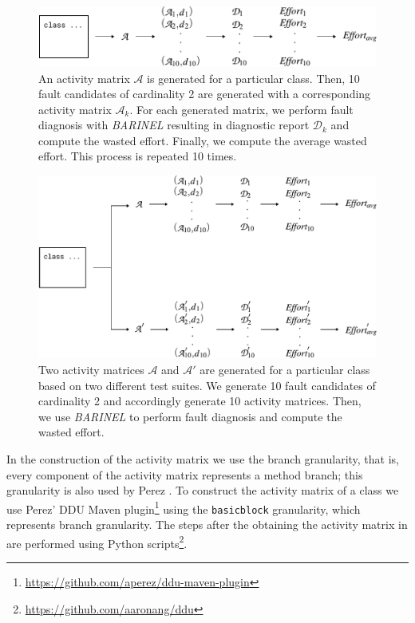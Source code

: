 \documentclass[twoside,a4paper,11pt]{memoir}
\begin{document}
\begin{figure}
  \includegraphics[width=\linewidth]{figures/fault_generation}
  \caption{An activity matrix $\mathcal{A}$ is generated for a particular class. Then, 10 fault candidates of cardinality 2 are generated with a corresponding activity matrix $\mathcal{A}_k$. For each generated matrix, we perform fault diagnosis with \emph{BARINEL} resulting in diagnostic report $\mathcal{D}_k$ and compute the wasted effort. Finally, we compute the average wasted effort. This process is repeated 10 times.}
  \label{fig:fault_generation}
\end{figure}

\begin{figure}
  \includegraphics[width=\linewidth]{figures/fault_generation_delta}
  \caption{Two activity matrices $\mathcal{A}$ and $\mathcal{A}'$ are generated for a particular class based on two different test suites. We generate 10 fault candidates of cardinality 2 and accordingly generate 10 activity matrices. Then, we use \emph{BARINEL} to perform fault diagnosis and compute the wasted effort.}
  \label{fig:fault_generation_delta}
\end{figure}

In the construction of the activity matrix we use the branch granularity, that is, every component of the activity matrix represents a method branch; this granularity is also used by Perez \etal \cite{DBLP:conf/icse/PerezAD17}.
To construct the activity matrix of a class we use Perez' DDU Maven plugin\footnote{\url{https://github.com/aperez/ddu-maven-plugin}} using the \texttt{basicblock} granularity, which represents branch granularity.
The steps after the obtaining the activity matrix in  are performed using Python scripts\footnote{\url{https://github.com/aaronang/ddu}}.
\end{document}
